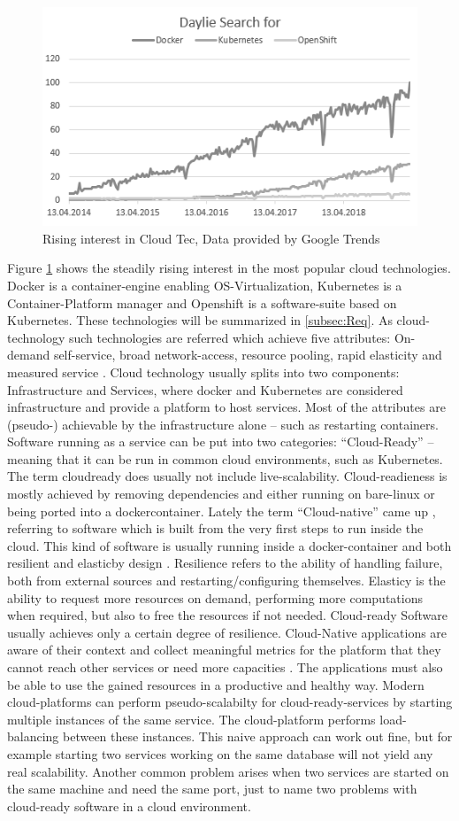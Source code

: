 \documentclass[utf8]{lni}
\begin{document}
\begin{figure}[h]
	\centering
	\includegraphics[width=0.5\linewidth]{imgs/DigDocker}
	\caption{Rising interest in Cloud Tec, Data provided by Google Trends}
	\label{fig:digdocker}	
\end{figure}

Figure \ref{fig:digdocker} shows the steadily rising interest in the most popular cloud technologies. 
Docker is a container-engine enabling OS-Virtualization, Kubernetes is a Container-Platform manager and Openshift is a software-suite based on Kubernetes. 
These technologies will be summarized in \ref{subsec:Req}.  
As cloud-technology such technologies are referred which achieve five attributes: 
On-demand self-service, broad network-access, resource pooling, rapid elasticity and measured service \cite{ME11}. 
Cloud technology usually splits into two components:  Infrastructure  and  Services,  where  docker and Kubernetes are considered infrastructure and provide a  platform  to  host  services.  
Most  of  the  attributes  are (pseudo-) achievable by the infrastructure alone – such as restarting containers. 
Software running as a service can be put into two categories: 
“Cloud-Ready” – meaning that it can be run in common cloud environments, such as Kubernetes. 
The term cloudready  does  usually  not  include  live-scalability. Cloud-readieness is mostly achieved by removing dependencies and either running on bare-linux or being ported into a dockercontainer. 
Lately the term “Cloud-native” came up \cite{BI17}, referring to software which is built from the very first steps to run inside the cloud. This kind of software is usually running inside a docker-container and both resilient and elasticby design \cite{TO17}.  
Resilience refers to the ability of handling failure, both from external sources and restarting/configuring themselves.  
Elasticy is the ability to request more resources on demand, performing more computations when required, but also to free the resources if not needed. 
Cloud-ready Software usually achieves only a certain degree of resilience.   
Cloud-Native applications are aware of their context and collect meaningful metrics for the platform that they cannot reach other services or need more capacities \cite{MIN18}. 
The applications must also be able to use the gained resources in a productive and healthy way.  
Modern  cloud-platforms  can  perform  pseudo-scalabilty for cloud-ready-services by starting multiple instances of the same service. 
The cloud-platform performs load-balancing between these instances. 
This naive approach can work out fine, but for example starting two services working on the same database will not yield any real scalability. 
Another common problem arises when two services are started on the same machine and need the same port, just to name two problems with cloud-ready  software in a cloud environment. 
\end{document}
